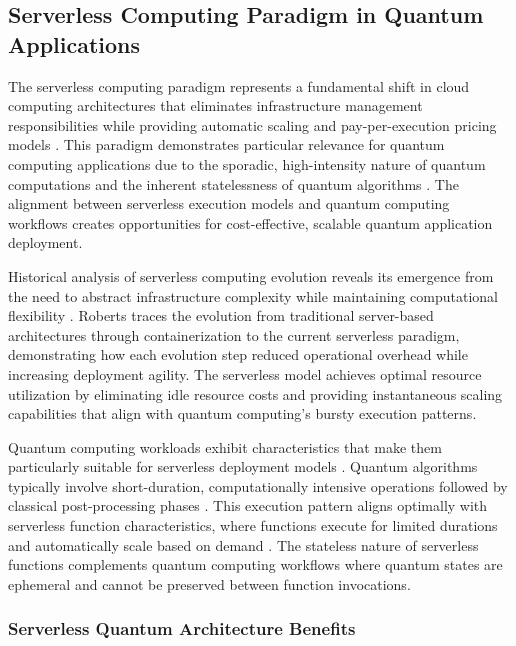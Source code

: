\documentclass[onecolumn]{IEEEtran}
\begin{document}
\subsection{Serverless Computing Paradigm in Quantum Applications}

The serverless computing paradigm represents a fundamental shift in cloud computing architectures that eliminates infrastructure management responsibilities while providing automatic scaling and pay-per-execution pricing models \cite{castro2019serverless}. This paradigm demonstrates particular relevance for quantum computing applications due to the sporadic, high-intensity nature of quantum computations and the inherent statelessness of quantum algorithms \cite{hellerstein2018serverless}. The alignment between serverless execution models and quantum computing workflows creates opportunities for cost-effective, scalable quantum application deployment.

Historical analysis of serverless computing evolution reveals its emergence from the need to abstract infrastructure complexity while maintaining computational flexibility \cite{jonas2019cloud}. Roberts \cite{roberts2018serverless} traces the evolution from traditional server-based architectures through containerization to the current serverless paradigm, demonstrating how each evolution step reduced operational overhead while increasing deployment agility. The serverless model achieves optimal resource utilization by eliminating idle resource costs and providing instantaneous scaling capabilities that align with quantum computing's bursty execution patterns.

Quantum computing workloads exhibit characteristics that make them particularly suitable for serverless deployment models \cite{leymann2020quantum}. Quantum algorithms typically involve short-duration, computationally intensive operations followed by classical post-processing phases \cite{preskill2018}. This execution pattern aligns optimally with serverless function characteristics, where functions execute for limited durations and automatically scale based on demand \cite{spillner2017faas}. The stateless nature of serverless functions complements quantum computing workflows where quantum states are ephemeral and cannot be preserved between function invocations.

\subsubsection{Serverless Quantum Architecture Benefits}
\end{document}
